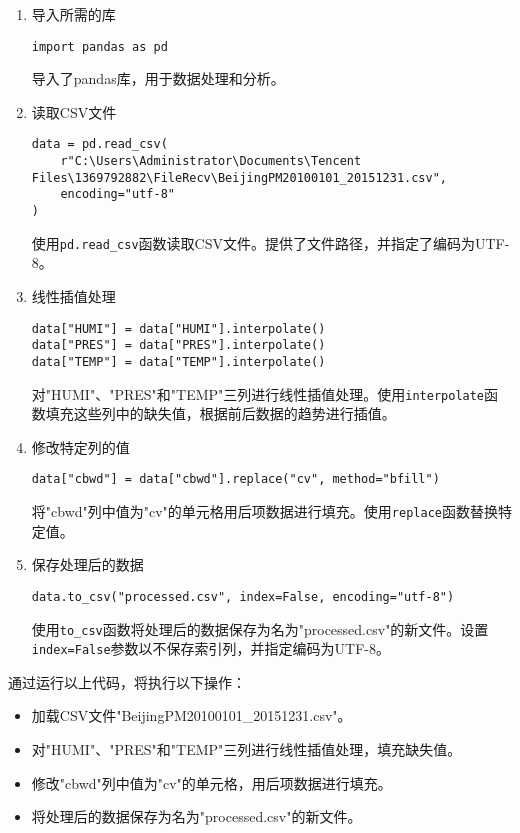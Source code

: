 \documentclass[lang=cn,11pt,a4paper]{elegantpaper}
\begin{document}
\begin{enumerate}
    \item 导入所需的库
    \begin{lstlisting}
import pandas as pd
    \end{lstlisting}
    导入了pandas库，用于数据处理和分析。
    \item 读取CSV文件
    \begin{lstlisting}
data = pd.read_csv(
    r"C:\Users\Administrator\Documents\Tencent Files\1369792882\FileRecv\BeijingPM20100101_20151231.csv",
    encoding="utf-8"
)
    \end{lstlisting}
    使用\lstinline{pd.read_csv}函数读取CSV文件。提供了文件路径，并指定了编码为UTF-8。
    \item 线性插值处理
    \begin{lstlisting}
data["HUMI"] = data["HUMI"].interpolate()
data["PRES"] = data["PRES"].interpolate()
data["TEMP"] = data["TEMP"].interpolate()
    \end{lstlisting}
    对"HUMI"、"PRES"和"TEMP"三列进行线性插值处理。使用\lstinline{interpolate}函数填充这些列中的缺失值，根据前后数据的趋势进行插值。

    \item 修改特定列的值
    \begin{lstlisting}
data["cbwd"] = data["cbwd"].replace("cv", method="bfill")
    \end{lstlisting}
    将"cbwd"列中值为"cv"的单元格用后项数据进行填充。使用\lstinline{replace}函数替换特定值。
    \item 保存处理后的数据
    \begin{lstlisting}
data.to_csv("processed.csv", index=False, encoding="utf-8")
    \end{lstlisting}
    使用\lstinline{to_csv}函数将处理后的数据保存为名为"processed.csv"的新文件。设置\lstinline{index=False}参数以不保存索引列，并指定编码为UTF-8。
\end{enumerate}

通过运行以上代码，将执行以下操作：
\begin{itemize}
    \item 加载CSV文件"BeijingPM20100101\_20151231.csv"。
    \item 对"HUMI"、"PRES"和"TEMP"三列进行线性插值处理，填充缺失值。
    \item 修改"cbwd"列中值为"cv"的单元格，用后项数据进行填充。
    \item 将处理后的数据保存为名为"processed.csv"的新文件。
\end{itemize}
\end{document}
